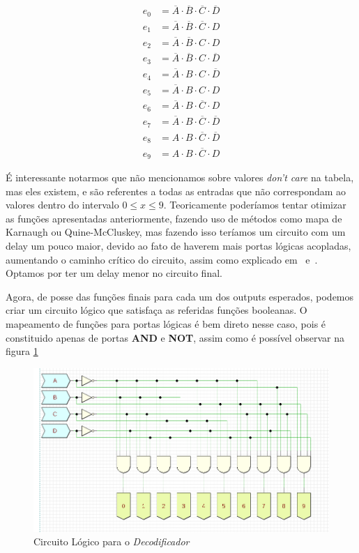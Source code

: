 \documentclass[12pt]{article}
\begin{document}
\begin{align}
e_{0} &= \overline{A} \cdot \overline{B} \cdot \overline{C} \cdot \overline{D} \\
e_{1} &= \overline{A} \cdot \overline{B} \cdot \overline{C} \cdot D \\
e_{2} &= \overline{A} \cdot \overline{B} \cdot C \cdot D \\
e_{3} &= \overline{A} \cdot \overline{B} \cdot C \cdot \overline{D} \\
e_{4} &= \overline{A} \cdot B \cdot C \cdot \overline{D} \\
e_{5} &= \overline{A} \cdot B \cdot C \cdot D \\
e_{6} &= \overline{A} \cdot B \cdot \overline{C} \cdot D \\
e_{7} &= \overline{A} \cdot B \cdot \overline{C} \cdot \overline{D} \\
e_{8} &= A \cdot B \cdot \overline{C} \cdot \overline{D} \\
e_{9} &= A \cdot B \cdot \overline{C} \cdot D
\end{align}

É interessante notarmos que não mencionamos sobre valores \emph{don't care} na
tabela, mas eles existem, e são referentes a todas as entradas que não
correspondam ao valores dentro do intervalo $0 \leq x \leq 9$. Teoricamente
poderíamos tentar otimizar as funções apresentadas anteriormente, fazendo uso de
métodos como mapa de Karnaugh ou Quine-McCluskey, mas fazendo isso teríamos um
circuito com um delay um pouco maior, devido ao fato de haverem mais portas
lógicas acopladas, aumentando o caminho crítico do circuito, assim como
explicado em~\cite{codificadores_e_decodificadores}
e~\cite{codificadores_mandelli}. Optamos por ter um delay menor no circuito
final.

Agora, de posse das funções finais para cada um dos outputs esperados, podemos
criar um circuito lógico que satisfaça as referidas funções booleanas. O
mapeamento de funções para portas lógicas é bem direto nesse caso, pois é
constituido apenas de portas \textbf{AND} e \textbf{NOT}, assim como é possível
observar na figura \ref{fig:Exp5__2_3_block.png}

\begin{figure}[htp]
    \centering
    \includegraphics[width=12cm]{Exp05/Exp5__2_3_block.png}
    \caption{Circuito Lógico para o \emph{Decodificador}}
    \label{fig:Exp5__2_3_block.png}
\end{figure}
\end{document}
